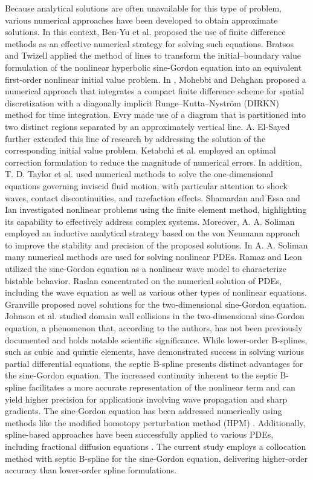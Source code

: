 \documentclass[10pt,letterpaper,twoside]{article}
\begin{document}
Because analytical solutions are often unavailable for this type of problem, various numerical approaches have been developed to obtain approximate solutions. In this context, Ben-Yu et al. \cite{2} proposed the use of finite difference methods as an effective numerical strategy for solving such equations. Bratsos and Twizell \cite{3} applied the method of lines to transform the initial--boundary value formulation of the nonlinear hyperbolic sine-Gordon equation into an equivalent first-order nonlinear initial value problem. In \cite{4}, Mohebbi and Dehghan proposed a numerical approach that integrates a compact finite difference scheme for spatial discretization with a diagonally implicit Runge--Kutta--Nyström (DIRKN) method for time integration. Evry \cite{5} made use of a diagram that is partitioned into two distinct regions separated by an approximately vertical line. A. El-Sayed \cite{6} further extended this line of research by addressing the solution of the corresponding initial value problem. Ketabchi et al. \cite{7} employed an optimal correction formulation to reduce the magnitude of numerical errors. In addition, T. D. Taylor et al. \cite{8} used numerical methods to solve the one-dimensional equations governing inviscid fluid motion, with particular attention to shock waves, contact discontinuities, and rarefaction effects. Shamardan and Essa \cite{9} and Ian \cite{10} investigated nonlinear problems using the finite element method, highlighting its capability to effectively address complex systems. Moreover, A. A. Soliman \cite{11,12} employed an inductive analytical strategy based on the von Neumann approach to improve the stability and precision of the proposed solutions. In A. A. Soliman \cite{13,14,15,16,17,18,19,20,21,22,23,24,25,26,27,28} many numerical methods are used for solving nonlinear PDEs. Ramaz and Leon \cite{29} utilized the sine-Gordon equation as a nonlinear wave model to characterize bistable behavior. Raslan \cite{30} concentrated on the numerical solution of PDEs, including the wave equation as well as various other types of nonlinear equations. Granville \cite{31} proposed novel solutions for the two-dimensional sine-Gordon equation. Johnson et al. \cite{32} studied domain wall collisions in the two-dimensional sine-Gordon equation, a phenomenon that, according to the authors, has not been previously documented and holds notable scientific significance. While lower-order B-splines, such as cubic \cite{34} and quintic \cite{35} elements, have demonstrated success in solving various partial differential equations, the septic B-spline presents distinct advantages for the sine-Gordon equation. The increased continuity inherent to the septic B-spline facilitates a more accurate representation of the nonlinear term and can yield higher precision for applications involving wave propagation and sharp gradients. The sine-Gordon equation has been addressed numerically using methods like the modified homotopy perturbation method (HPM) \cite{36}. Additionally, spline-based approaches have been successfully applied to various PDEs, including fractional diffusion equations \cite{37}. The current study employs a collocation method with septic B-spline for the sine-Gordon equation, delivering higher-order accuracy than lower-order spline formulations.
\end{document}
